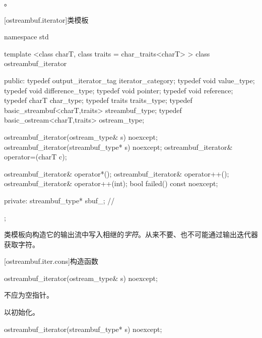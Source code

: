\begin{itemdescr}
\pnum
\returns
{}。
\end{itemdescr}

[ostreambuf.iterator]{类模板}

%
\begin{codeblock}
namespace std {
  template <class charT, class traits = char_traits<charT> >
  class ostreambuf_iterator {
  public:
    typedef output_iterator_tag           iterator_category;
    typedef void                          value_type;
    typedef void                          difference_type;
    typedef void                          pointer;
    typedef void                          reference;
    typedef charT                         char_type;
    typedef traits                        traits_type;
    typedef basic_streambuf<charT,traits> streambuf_type;
    typedef basic_ostream<charT,traits>   ostream_type;

    ostreambuf_iterator(ostream_type& s) noexcept;
    ostreambuf_iterator(streambuf_type* s) noexcept;
    ostreambuf_iterator& operator=(charT c);

    ostreambuf_iterator& operator*();
    ostreambuf_iterator& operator++();
    ostreambuf_iterator& operator++(int);
    bool failed() const noexcept;

  private:
    streambuf_type* sbuf_;                // \expos
  };
}
\end{codeblock}

\pnum
类模板向构造它的输出流中写入相继的\textit{字符}。从来不要、也不可能通过输出迭代器获取字符。

[ostreambuf.iter.cons]{构造函数}


%
\begin{itemdecl}
ostreambuf_iterator(ostream_type& s) noexcept;
\end{itemdecl}

\begin{itemdescr}
\pnum
\requires
{}不应为空指针。

\pnum
\effects
以初始化。
\end{itemdescr}


%
\begin{itemdecl}
ostreambuf_iterator(streambuf_type* s) noexcept;
\end{itemdecl}

